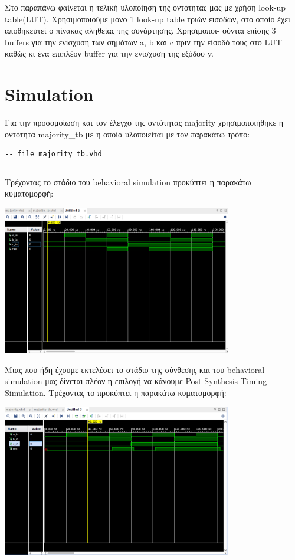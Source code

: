 \documentclass[]{article}
\begin{document}
Στο παραπάνω φαίνεται η τελική υλοποίηση της οντότητας μας με χρήση look-up table(LUT). Χρησιμοποιούμε μόνο
1 look-up table τριών εισόδων, στο οποίο έχει αποθηκευτεί ο πίνακας αληθείας της συνάρτησης. Χρησιμοποι-
ούνται επίσης 3 buffers για την ενίσχυση των σημάτων a, b και c πριν την είσοδό τους στο LUT καθώς κι ένα επιπλέον buffer για την ενίσχυση της εξόδου y.

\section{Simulation}
Για την προσομοίωση και τον έλεγχο της οντότητας majority χρησιμοποιήθηκε η οντότητα majority\_tb με η οποία υλοποιείται με τον παρακάτω τρόπο:
\begin{verbatim}
-- file majority_tb.vhd
\end{verbatim}
\inputminted{vhdl}{./assign_1/majority_tb.vhdl}

Τρέχοντας το στάδιο του behavioral simulation προκύπτει η παρακάτω κυματομορφή:
\begin{center}
	\includegraphics[width=10cm]{behavioral.png}
\end{center}

Μιας που ήδη έχουμε εκτελέσει το στάδιο της σύνθεσης και του behavioral simulation μας δίνεται πλέον η επιλογή να κάνουμε Post Synthesis Timing Simulation.
Τρέχοντας το προκύπτει η παρακάτω κυματομορφή:
\begin{center}
	\includegraphics[width=10cm]{post_synthesis_timing.png}
\end{center}
\end{document}
